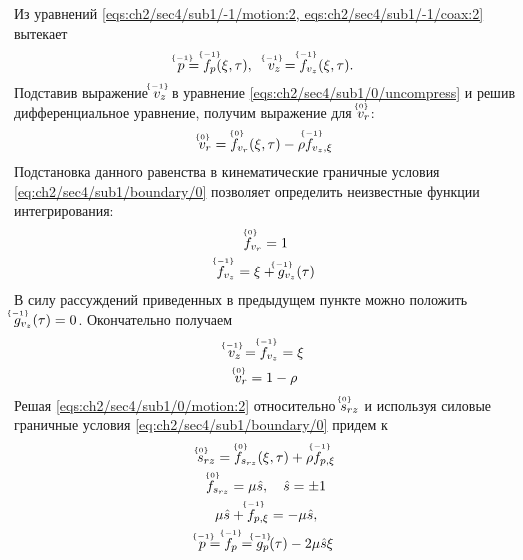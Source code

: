 Из уравнений \cref{eqs:ch2/sec4/sub1/-1/motion:2, eqs:ch2/sec4/sub1/-1/coax:2} вытекает
\begin{equation*}
  \uindex{p}{-1} = \uindex{f}{-1}_{p}(\xi, \tau), \quad \uindex{v}{-1}_{z} = \uindex{f}{-1}_{v_{z}}(\xi, \tau).
\end{equation*}
Подставив выражение $\uindex{v}{-1}_{z}$ в уравнение \cref{eqs:ch2/sec4/sub1/0/uncompress} и решив дифференциальное уравнение, получим выражение для $\uindex{v}{0}_{r}$:
\begin{equation*}
  \uindex{v}{0}_{r} = \uindex{f}{0}_{v_{r}}(\xi, \tau) -\rho \uindex{f}{-1}_{v_{z},\xi}
\end{equation*}
Подстановка данного равенства в кинематические граничные условия \cref{eq:ch2/sec4/sub1/boundary/0} позволяет определить неизвестные функции интегрирования:
\begin{gather*}
  \uindex{f}{0}_{v_{r}} = 1
  \\
  \uindex{f}{-1}_{v_{z}} = \xi + \uindex{g}{-1}_{v_{z}}(\tau)
\end{gather*}
В силу рассуждений приведенных в предыдущем пункте можно положить $\uindex{g}{-1}_{v_{z}}(\tau) = 0$. Окончательно получаем
\begin{gather}
  \label{sol:ch2/sec4/sub1/vz/-1}
  \uindex{v}{-1}_{z} = \uindex{f}{-1}_{v_{z}} = \xi
  \\
  \label{sol:ch2/sec4/sub1/vr/0}
  \uindex{v}{0}_{r} =  1 - \rho
\end{gather}
Решая \cref{eqs:ch2/sec4/sub1/0/motion:2} относительно $\uindex{s}{0}_{rz}$ и используя силовые граничные условия \cref{eq:ch2/sec4/sub1/boundary/0} придем к
\begin{gather*}
  \uindex{s}{0}_{rz} = \uindex{f}{0}_{s_{rz}}(\xi, \tau) + \rho \uindex{f}{-1}_{p,\xi}
  \\
  \uindex{f}{0}_{s_{rz}} = \mu\hat{s}, \quad \hat{s} = \pm 1
  \\
  \mu\hat{s} +\uindex{f}{-1}_{p,\xi} = -\mu \hat{s},
  \\
  \uindex{p}{-1}=\uindex{f}{-1}_{p} =\uindex{g}{-1}_{p}(\tau) -2\mu\hat{s}\xi
\end{gather*}

